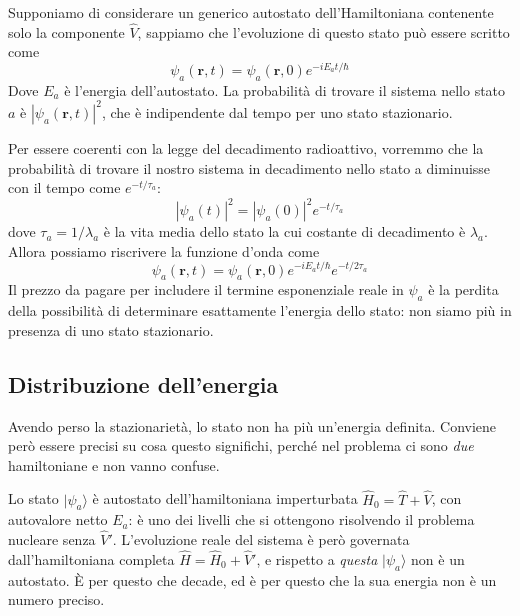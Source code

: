 Supponiamo di considerare un generico autostato dell'Hamiltoniana contenente solo la componente $\hat{V}$, sappiamo che l'evoluzione di questo stato può essere scritto come 
%
\begin{equation*}
    \psi_a(\mathbf{r}, t) = \psi_a(\mathbf{r}, 0) e^{-i E_a t/\hbar}
\end{equation*}
Dove $E_a$ è l'energia dell'autostato. La probabilità di trovare il sistema nello stato $a$ è $|\psi_a(\mathbf{r}, t)|^2$, che è indipendente dal tempo per uno stato stazionario.

Per essere coerenti con la legge del decadimento radioattivo, vorremmo che la probabilità di trovare il nostro sistema in decadimento nello stato a diminuisse con il tempo come $e^{-t/\tau_a}$:
%
\begin{equation*}
    |\psi_a(t)|^2 = |\psi_a(0)|^2 e^{-t/\tau_a}
\end{equation*}
dove $\tau_a = 1/\lambda_a$ è la vita media dello stato la cui costante di decadimento è $\lambda_a$.\\ 
Allora possiamo riscrivere la funzione d'onda come 
%
\begin{equation}
    \psi_a(\mathbf{r}, t) = \psi_a(\mathbf{r}, 0) e^{-i E_a t/\hbar} e^{-t/2\tau_a}
\end{equation}
Il prezzo da pagare per includere il termine esponenziale reale in $\psi_a$ è la perdita della possibilità di determinare esattamente l'energia dello stato: non siamo più in presenza di uno stato stazionario.

\subsection{Distribuzione dell'energia}

Avendo perso la stazionarietà, lo stato non ha più un'energia definita. Conviene però essere precisi su cosa questo significhi, perché nel problema ci sono \emph{due} hamiltoniane e non vanno confuse.

Lo stato $|\psi_a\rangle$ è autostato dell'hamiltoniana imperturbata $\hat{H}_0 = \hat{T} + \hat{V}$, con autovalore netto $E_a$: è uno dei livelli che si ottengono risolvendo il problema nucleare senza $\hat{V}'$. L'evoluzione reale del sistema è però governata dall'hamiltoniana completa $\hat{H} = \hat{H}_0 + \hat{V}'$, e rispetto a \emph{questa} $|\psi_a\rangle$ non è un autostato. È per questo che decade, ed è per questo che la sua energia non è un numero preciso.\\

